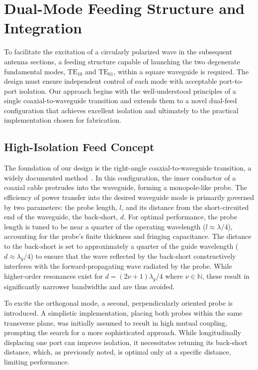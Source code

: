 \documentclass[journal]{IEEEtran}
\newcommand{\TE}[2]{\text{TE}_{#1#2}}
\begin{document}
\section{Dual-Mode Feeding Structure and Integration}
\label{sec:dual-mode-feeding-structure-and-integration}

To facilitate the excitation of a circularly polarized wave in the subsequent antenna sections, a feeding structure capable of launching the two degenerate fundamental modes, $\TE 10$ and $\TE 01$, within a square waveguide is required. The design must ensure independent control of each mode with acceptable port-to-port isolation. Our approach begins with the well-understood principles of a single coaxial-to-waveguide transition and extends them to a novel dual-feed configuration that achieves excellent isolation and ultimately to the practical implementation chosen for fabrication.

\subsection{High-Isolation Feed Concept}

The foundation of our design is the right-angle coaxial-to-waveguide transition, a widely documented method~\cite{fabregas-et-al:coaxial-to-rectangular-waveguide-transitions}. In this configuration, the inner conductor of a coaxial cable protrudes into the waveguide, forming a monopole-like probe. The efficiency of power transfer into the desired waveguide mode is primarily governed by two parameters: the probe length, $l$, and its distance from the short-circuited end of the waveguide, the back-short, $d$. For optimal performance, the probe length is tuned to be near a quarter of the operating wavelength ($l \approx \lambda/4$), accounting for the probe's finite thickness and fringing capacitance. The distance to the back-short is set to approximately a quarter of the guide wavelength ($d \approx \lambda_g/4$) to ensure that the wave reflected by the back-short constructively interferes with the forward-propagating wave radiated by the probe. While higher-order resonances exist for $d = (2\nu+1)\lambda_g/4$ where $\nu \in \mathbb{N}$, these result in significantly narrower bandwidths and are thus avoided.

To excite the orthogonal mode, a second, perpendicularly oriented probe is introduced. A simplistic implementation, placing both probes within the same transverse plane, was initially assumed to result in high mutual coupling, prompting the search for a more sophisticated approach. While longitudinally displacing one port can improve isolation, it necessitates retuning its back-short distance, which, as previously noted, is optimal only at a specific distance, limiting performance.
\end{document}
